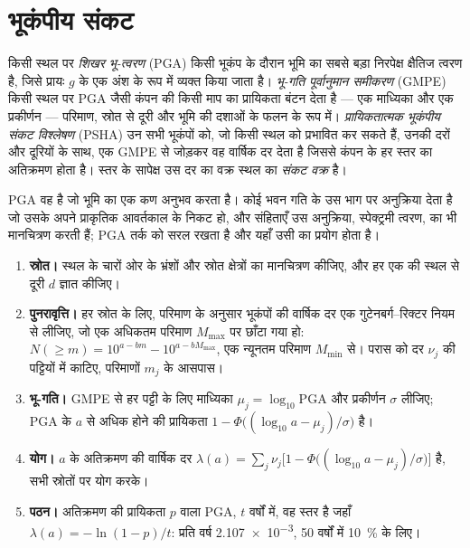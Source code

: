 \section{भूकंपीय संकट}\label{sec:b2:geological-hazards:seismic}

\begin{definition}\label{def:b2:geological-hazards:psha}
किसी स्थल पर \emph{शिखर भू-त्वरण} (PGA) किसी भूकंप के दौरान भूमि का सबसे बड़ा
निरपेक्ष क्षैतिज त्वरण है, जिसे प्रायः $g$ के एक अंश के रूप में व्यक्त किया जाता है।
\emph{भू-गति पूर्वानुमान समीकरण} (GMPE)
किसी स्थल पर PGA जैसी कंपन की किसी माप का प्रायिकता बंटन देता है --- एक माध्यिका और एक प्रकीर्णन ---
परिमाण, स्रोत से दूरी और भूमि की दशाओं के फलन के रूप में। \emph{प्रायिकतात्मक भूकंपीय संकट
विश्लेषण} (PSHA) उन सभी भूकंपों को,
जो किसी स्थल को प्रभावित कर सकते हैं,
उनकी दरों और दूरियों के साथ, एक GMPE से जोड़कर वह वार्षिक दर देता है जिससे कंपन के हर स्तर का
अतिक्रमण होता है। स्तर के सापेक्ष उस दर का वक्र स्थल का \emph{संकट
वक्र} है।
\end{definition}

PGA वह है जो भूमि का एक कण अनुभव करता है। कोई भवन गति के उस भाग पर अनुक्रिया देता है जो उसके
अपने प्राकृतिक आवर्तकाल के निकट हो, और संहिताएँ उस अनुक्रिया, स्पेक्ट्रमी त्वरण, का भी मानचित्रण करती हैं;
PGA तर्क को सरल रखता है और यहाँ उसी का प्रयोग होता है।

\begin{method}[एक प्रायिकतात्मक भूकंपीय संकट विश्लेषण]\label{met:b2:geological-hazards:psha}
\begin{enumerate}
  \item \textbf{स्रोत।} स्थल के चारों ओर के भ्रंशों और स्रोत क्षेत्रों का मानचित्रण कीजिए, और हर एक की स्थल से
        दूरी $d$ ज्ञात कीजिए।
  \item \textbf{पुनरावृत्ति।} हर स्रोत के लिए, परिमाण के अनुसार भूकंपों की वार्षिक दर
        एक गुटेनबर्ग--रिक्टर नियम से लीजिए, जो एक अधिकतम परिमाण $M_{\max}$ पर छाँटा गया हो:
        $N(\geq m) = 10^{a - bm} - 10^{a - bM_{\max}}$, एक न्यूनतम परिमाण $M_{\min}$ से।
        परास को दर $\nu_j$ की पट्टियों में काटिए, परिमाणों $m_j$ के आसपास।
  \item \textbf{भू-गति।} GMPE से हर पट्टी के लिए माध्यिका $\mu_j = \log_{10}\mathrm{PGA}$ और
        प्रकीर्णन $\sigma$ लीजिए; PGA के $a$ से अधिक होने की प्रायिकता
        $1 - \Phi\bigl((\log_{10} a - \mu_j)/\sigma\bigr)$ है।
  \item \textbf{योग।} $a$ के अतिक्रमण की वार्षिक दर $\lambda(a) = \sum_j \nu_j
        \bigl[1 - \Phi\bigl((\log_{10} a - \mu_j)/\sigma\bigr)\bigr]$ है, सभी स्रोतों पर योग करके।
  \item \textbf{पठन।} अतिक्रमण की प्रायिकता $p$ वाला PGA, $t$ वर्षों में, वह स्तर है जहाँ
        $\lambda(a) = -\ln(1 - p)/t$: प्रति वर्ष \num{2.107e-3}, 50 वर्षों में \qty{10}{\percent} के लिए।
\end{enumerate}
\end{method}

